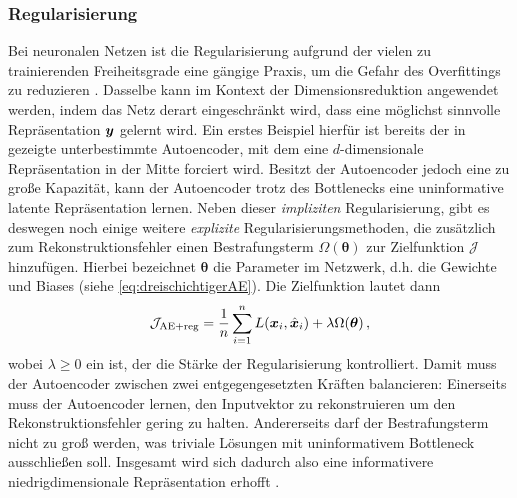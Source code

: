 \subsubsection{Regularisierung}
\label{ch:MethodenDerDimRed:ML:AE:Regularisierung}
Bei neuronalen Netzen ist die Regularisierung aufgrund der vielen zu trainierenden Freiheitsgrade eine gängige Praxis, um die Gefahr des Overfittings zu reduzieren \parencite[228]{Goodfellow.2016}. Dasselbe kann im Kontext der Dimensionsreduktion angewendet werden,
indem das Netz derart eingeschränkt wird, dass eine möglichst sinnvolle Repräsentation $\bm{y}$
gelernt wird. Ein erstes Beispiel hierfür ist bereits der in 
gezeigte unterbestimmte Autoencoder, mit dem eine $d$-dimensionale Repräsentation in der Mitte
forciert wird. Besitzt der Autoencoder jedoch eine zu große Kapazität, kann der Autoencoder trotz
des Bottlenecks eine uninformative latente Repräsentation lernen. Neben dieser \textit{impliziten}
Regularisierung, gibt es deswegen noch einige weitere \textit{explizite} Regularisierungsmethoden,
die zusätzlich zum Rekonstruktionsfehler einen Bestrafungsterm $\Omega(\bm{\theta})$ zur
Zielfunktion $\mathcal{J}$ hinzufügen. Hierbei bezeichnet $\bm{\theta}$ die Parameter im Netzwerk,
d.h. die Gewichte und Biases (siehe \eqref{eq:dreischichtigerAE}). Die Zielfunktion lautet dann
\begin{equation}
	\mathcal{J}_{\text{AE+reg}} = \frac{1}{n} \sum_{i = 1}^{n}  L(\bm{x}_i, \hat{\bm{x}}_i) + \lambda \Omega(\bm{\theta}) \, ,
\end{equation}
wobei $\lambda \geq 0$ ein  ist, der die Stärke der Regularisierung kontrolliert. Damit muss der Autoencoder zwischen zwei entgegengesetzten Kräften balancieren: Einerseits muss der Autoencoder lernen, den Inputvektor zu rekonstruieren um den Rekonstruktionsfehler gering zu halten. Andererseits darf der Bestrafungsterm nicht zu groß werden, was triviale Lösungen mit uninformativem Bottleneck ausschließen soll. Insgesamt wird sich dadurch also eine informativere niedrigdimensionale Repräsentation erhofft \parencite[516]{Goodfellow.2016}.

